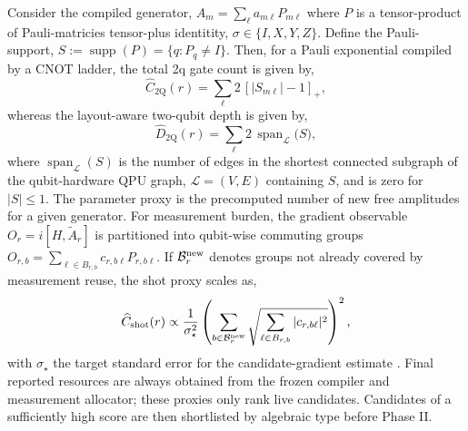 \documentclass[
  reprint,
  amsmath,
  amssymb,
  aps,
  pra,
  nofootinbib,
  superscriptaddress,
  floatfix
]{revtex4-2}
\newcommand{\twq}{\mathrm{2Q}}
\begin{document}
Consider the compiled generator, $A_m=\sum_{\ell}a_{m\ell}P_{m\ell}$ where $P$ is a tensor-product of Pauli-matricies tensor-plus identitity, $\sigma \in \{I,X,Y,Z\}$. Define the Pauli-support, $S:=\operatorname{supp}(P)=\{q:P_q\ne I\}$. Then, for a Pauli exponential compiled by a CNOT ladder, the total 2q gate count is given by,
\begin{equation}
\widehat C_{\twq}(r)=\sum_{\ell}2\,[|S_{m\ell}|-1]_+,
\label{eq:pauli_2count_proxy}
\end{equation}
whereas the layout-aware two-qubit depth is given by,
\begin{equation}
\widehat D_{\twq}(r)=\sum_{\ell}2\,\operatorname{span}_{\mathcal L}
\bigl(S\bigr),
\label{eq:pauli_2depth_proxy}
\end{equation}
where $\operatorname{span}_{\mathcal L}(S)$ is the number of edges in the shortest connected subgraph of the qubit-hardware QPU graph, $\mathcal L = (V,E)$ containing $S$, and is zero for $|S|\le1$. The parameter proxy is the precomputed number of new free amplitudes for a given generator. For measurement burden, the gradient observable $O_r=i[H,\widetilde A_r]$ is partitioned into qubit-wise commuting groups $O_{r,b}=\sum_{\ell\in B_{r,b}}c_{r,b\ell}P_{r,b\ell}$. If $\mathcal B_r^{\rm new}$ denotes groups not already covered by measurement reuse, the shot proxy scales as,
\begin{equation}
\widehat C_{\rm shot}(r)\propto
\frac{1}{\sigma_\star^2}
\left(
\sum_{b\in\mathcal B_r^{\rm new}}
\sqrt{\sum_{\ell\in B_{r,b}}|c_{r,b\ell}|^2}
\right)^2,
\label{eq:shot_cost_proxy}
\end{equation}
with $\sigma_\star$ the target standard error for the candidate-gradient estimate \cite{Ikhtiarudin2025ShotEfficient}. Final reported resources are always obtained from the frozen compiler and measurement allocator; these proxies only rank live candidates. Candidates of a sufficiently high score are then shortlisted by algebraic type before Phase II.
\end{document}
